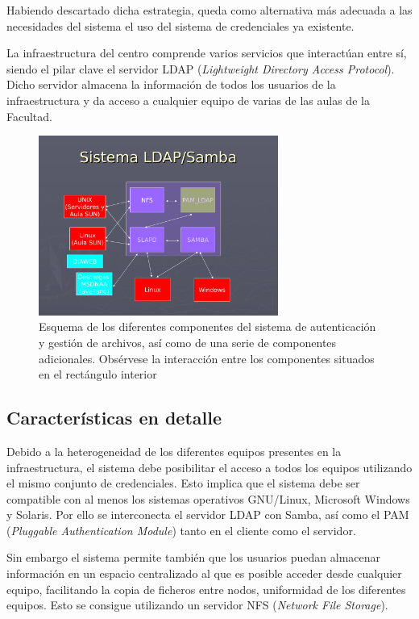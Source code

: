 Habiendo descartado dicha estrategia, queda como alternativa más adecuada a las necesidades del sistema el uso del sistema de credenciales ya existente.

La infraestructura del centro comprende varios servicios que interactúan entre sí, siendo el pilar clave el servidor LDAP (\textit{Lightweight Directory Access Protocol}). Dicho servidor almacena la información de todos los usuarios de la infraestructura y da acceso a cualquier equipo de varias de las aulas de la Facultad.

\begin{figure}[H]
	\centering
	\includegraphics[width=0.7\textwidth]{Chapter6/Figures/LDAP.pdf}
	\caption[Esquema de los componentes del sistema de autenticación y gestión de archivos]{Esquema de los diferentes componentes del sistema de autenticación y gestión de archivos, así como de una serie de componentes adicionales. Obsérvese la interacción entre los componentes situados en el rectángulo interior}
	\label{fig:arquitectura_ldap}
\end{figure}

\subsection{Características en detalle}

Debido a la heterogeneidad de los diferentes equipos presentes en la infraestructura, el sistema debe posibilitar el acceso a todos los equipos utilizando el mismo conjunto de credenciales. Esto implica que el sistema debe ser compatible con al menos los sistemas operativos GNU/Linux, Microsoft Windows y Solaris. Por ello se interconecta el servidor LDAP con Samba, así como el PAM (\textit{Pluggable Authentication Module}) tanto en el cliente como el servidor.

Sin embargo el sistema permite también que los usuarios puedan almacenar información en un espacio centralizado al que es posible acceder desde cualquier equipo, facilitando la copia de ficheros entre nodos, uniformidad de los diferentes equipos. Esto se consigue utilizando un servidor NFS (\textit{Network File Storage}).

